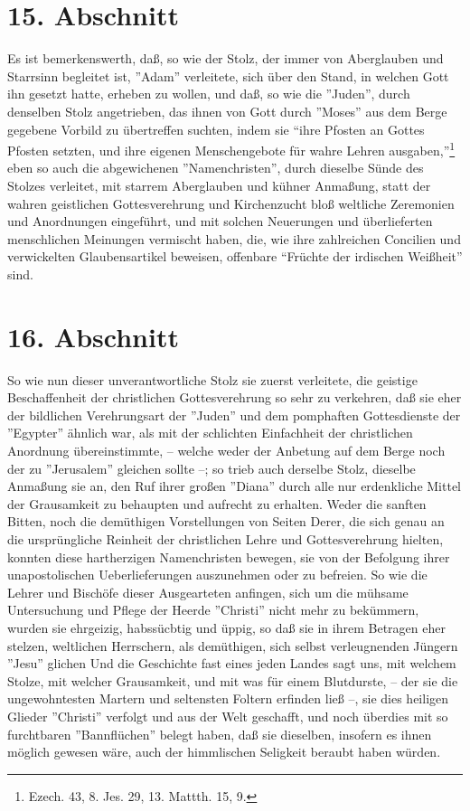 \section{15. Abschnitt}

Es ist bemerkenswerth, daß, so wie der Stolz, der immer von Aberglauben und
Starrsinn begleitet ist, ''Adam'' verleitete, sich über den Stand, in welchen
Gott ihn gesetzt hatte, erheben zu wollen, und daß, so wie die ''Juden'', durch
denselben Stolz angetrieben, das ihnen von Gott durch ''Moses'' aus dem Berge
gegebene Vorbild zu übertreffen suchten, indem sie "`ihre Pfosten an Gottes
Pfosten setzten, und ihre eigenen Menschengebote für wahre Lehren
ausgaben,"'\footnote{Ezech. 43, 8. Jes. 29, 13. Mattth. 15, 9.} eben so auch die
abgewichenen ''Namenchristen'', durch dieselbe Sünde des Stolzes verleitet, mit
starrem Aberglauben und kühner Anmaßung, statt der wahren geistlichen
Gottesverehrung und Kirchenzucht bloß weltliche Zeremonien und Anordnungen
eingeführt, und mit solchen Neuerungen und überlieferten menschlichen Meinungen
vermischt haben, die, wie ihre zahlreichen Concilien und verwickelten
Glaubensartikel beweisen, offenbare "`Früchte der irdischen Weißheit"' sind.

\section{16. Abschnitt}

So wie nun dieser unverantwortliche Stolz sie zuerst verleitete, die geistige
Beschaffenheit der christlichen Gottesverehrung so sehr zu verkehren, daß sie
eher der bildlichen Verehrungsart der ''Juden'' und dem pomphaften Gottesdienste
der ''Egypter'' ähnlich war, als mit der schlichten Einfachheit der christlichen
Anordnung übereinstimmte, -- welche weder der Anbetung auf dem Berge noch der zu
''Jerusalem'' gleichen sollte --; so trieb auch derselbe Stolz, dieselbe
Anmaßung sie an, den Ruf ihrer großen ''Diana'' durch alle nur erdenkliche
Mittel der Grausamkeit zu behaupten und aufrecht zu erhalten. Weder die sanften
Bitten, noch die demüthigen Vorstellungen von Seiten Derer, die sich genau an
die ursprüngliche Reinheit der christlichen Lehre und Gottesverehrung hielten,
konnten diese hartherzigen Namenchristen bewegen, sie von der Befolgung ihrer
unapostolischen Ueberlieferungen auszunehmen oder zu befreien. So wie die Lehrer
und Bischöfe dieser Ausgearteten anfingen, sich um die mühsame Untersuchung und
Pflege der Heerde ''Christi'' nicht mehr zu bekümmern, wurden sie ehrgeizig,
habssücbtig und üppig, so daß sie in ihrem Betragen eher stelzen, weltlichen
Herrschern, als demüthigen, sich selbst verleugnenden Jüngern ''Jesu'' glichen
Und die Geschichte fast eines jeden Landes sagt uns, mit welchem Stolze, mit
welcher Grausamkeit, und mit was für einem Blutdurste, -- der sie die
ungewohntesten Martern und seltensten Foltern erfinden ließ --, sie dies
heiligen Glieder ''Christi'' verfolgt und aus der Welt geschafft, und noch
überdies mit so furchtbaren ''Bannflüchen'' belegt haben, daß sie dieselben,
insofern es ihnen möglich gewesen wäre, auch der himmlischen Seligkeit beraubt
haben würden.

